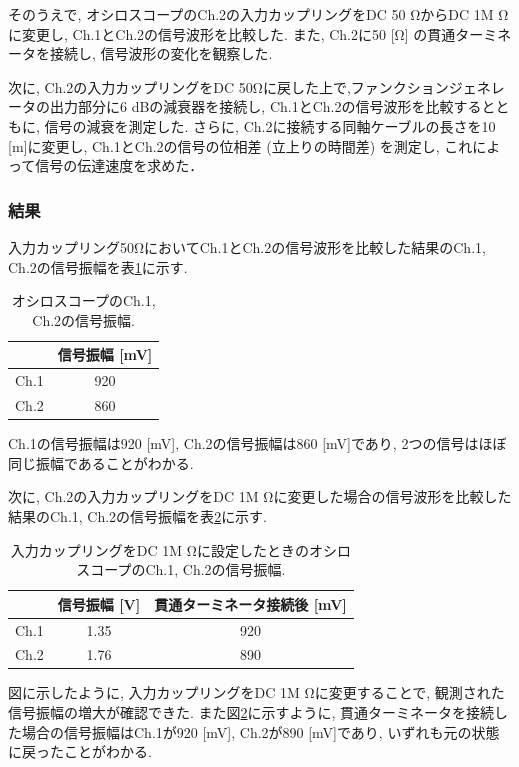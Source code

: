 \documentclass[uplatex,dvipdfmx,a4j,12pt]{jsarticle}
\begin{document}
そのうえで, オシロスコープのCh.2の入力カップリングをDC 50 \si{\ohm}からDC 1M \si{\ohm}に変更し, Ch.1とCh.2の信号波形を比較した.
また, Ch.2に50 [\si{\ohm}] の貫通ターミネータを接続し, 信号波形の変化を観察した.

次に, Ch.2の入力カップリングをDC 50\si{\ohm}に戻した上で,ファンクションジェネレータの出力部分に6 dBの減衰器を接続し, Ch.1とCh.2の信号波形を比較するとともに, 信号の減衰を測定した.
さらに, Ch.2に接続する同軸ケーブルの長さを10 [m]に変更し, Ch.1とCh.2の信号の位相差 (立上りの時間差) を測定し, これによって信号の伝達速度を求めた．



\subsubsection{結果}
入力カップリング50\si{\ohm}においてCh.1とCh.2の信号波形を比較した結果のCh.1, Ch.2の信号振幅を表\ref{table:1-1-1}に示す.
\begin{table}[h]
    \centering
    \caption{オシロスコープのCh.1, Ch.2の信号振幅.}
    \label{table:1-1-1}
    \begin{tabular}{cc}
        \hline
        & 信号振幅 [mV]\\
        \hline\hline
        Ch.1 & 920  \\
        Ch.2 & 860  \\
        \hline
    \end{tabular}
\end{table}
Ch.1の信号振幅は920 [mV], Ch.2の信号振幅は860 [mV]であり, 2つの信号はほぼ同じ振幅であることがわかる.

次に, Ch.2の入力カップリングをDC 1M \si{\ohm}に変更した場合の信号波形を比較した結果のCh.1, Ch.2の信号振幅を表\ref{table:-1-1-2}に示す.
\begin{table}[h]
    \centering
    \caption{入力カップリングをDC 1M \si{\ohm}に設定したときのオシロスコープのCh.1, Ch.2の信号振幅.}
    \label{table:-1-1-2}
    \begin{tabular}{ccc}
        \hline
        & 信号振幅 [V] & 貫通ターミネータ接続後 [mV]\\ %
        \hline\hline
        Ch.1 & 1.35 & 920 \\
        Ch.2 & 1.76 & 890\\
        \hline
    \end{tabular}
\end{table}
図に示したように, 入力カップリングをDC 1M \si{\ohm}に変更することで, 観測された信号振幅の増大が確認できた.
また図\ref{table:-1-1-2}に示すように, 貫通ターミネータを接続した場合の信号振幅はCh.1が920 [mV], Ch.2が890 [mV]であり, いずれも元の状態に戻ったことがわかる.
\end{document}
